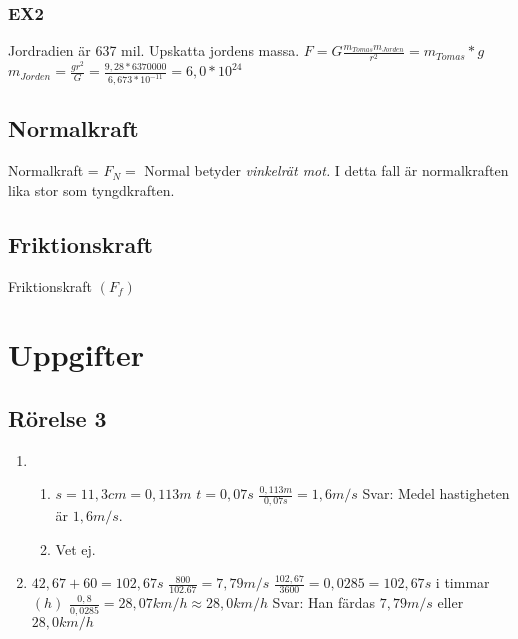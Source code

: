 \documentclass[a4paper,11pt]{article}
\begin{document}
\begin{flushleft}
\subsubsection{EX2}
Jordradien är 637 mil. Upskatta jordens massa.\newline
$ F=G\frac{m_{Tomas} m_{Jorden}}{r^2}=m_{Tomas}*g $\newline
$ m_{Jorden}=\frac{gr^2}{G}=\frac{9,28*6370000}{6,673*10^{-11}}=6,0*10^{24} $
\subsection{Normalkraft}
Normalkraft = $F_N=$\newline
Normal betyder \textit{vinkelrät mot.}\newline
I detta fall är normalkraften lika stor som tyngdkraften.
\subsection{Friktionskraft}
Friktionskraft $( F_f )$\newline
\newpage
\section{Uppgifter}
\subsection{Rörelse 3}
\begin{enumerate}
  \item \begin{enumerate}
    \item $ s=11,3cm=0,113m $\newline
    $ t=0,07s $\newline
    $ \frac{0,113m}{0,07s}=1,6m/s $\newline
    Svar: Medel hastigheten är $ 1,6m/s $.
    \item Vet ej.
  \end{enumerate}
  \item $ 42,67+60=102,67s $\newline
  $ \frac{800}{102.67}=7,79m/s $\newline
  \newline
  $ \frac{102,67}{3600}=0,0285 = 102,67s $ i timmar$(h)$\newline
  \newline
  $ \frac{0,8}{0,0285}=28,07km/h\approx28,0km/h $\newline
  \newline
  Svar: Han färdas $ 7,79m/s $ eller $ 28,0km/h $  
  

\end{enumerate}
\end{flushleft}
\end{document}
